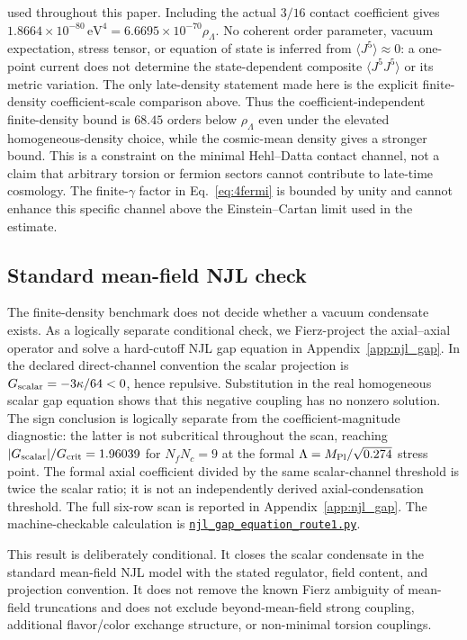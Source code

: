 \documentclass[aps,prd,twocolumn,superscriptaddress,showpacs,preprintnumbers,nofootinbib,longbibliography,floatfix]{revtex4-2}
\newcommand{\artifactnamed}[2]{\href{https://github.com/Hubify-Projects/bigbounce/blob/main/#1}{\nolinkurl{#2}}}
\begin{document}
used throughout this paper.  Including the actual $3/16$ contact coefficient
gives $1.8664\times10^{-80}\,\text{eV}^4=6.6695\times10^{-70}\rho_\Lambda$.
No coherent order parameter, vacuum expectation, stress tensor, or equation of
state is inferred from $\langle J^5\rangle\approx0$: a one-point current does
not determine the state-dependent composite $\langle J^5J^5\rangle$ or its
metric variation.  The only late-density statement made here is the explicit
finite-density coefficient-scale comparison above.
Thus the coefficient-independent finite-density bound is $68.45$ orders below
$\rho_\Lambda$ even under the elevated homogeneous-density choice, while the
cosmic-mean density gives a stronger bound.  This is a constraint on the
minimal Hehl--Datta contact channel, not a claim that arbitrary torsion or
fermion sectors cannot contribute to late-time cosmology.  The finite-$\gamma$
factor in Eq.~\eqref{eq:4fermi} is bounded by unity and cannot enhance this
specific channel above the Einstein--Cartan limit used in the estimate.

\subsection{Standard mean-field NJL check}

The finite-density benchmark does not decide whether a vacuum condensate
exists.  As a logically separate conditional check, we Fierz-project the
axial--axial operator and solve a
hard-cutoff NJL gap equation in Appendix~\ref{app:njl_gap}.  In the declared
direct-channel convention the scalar projection is
$G_{\rm scalar}=-3\kappa/64<0$, hence repulsive.  Substitution in the real
homogeneous scalar gap equation shows that this negative coupling has no
nonzero solution.  The sign conclusion is logically separate from the
coefficient-magnitude diagnostic: the latter is not subcritical throughout
the scan, reaching $|G_{\rm scalar}|/G_{\rm crit}=1.96039$ for
$N_fN_c=9$ at the formal $\Lambda=M_{\rm Pl}/\sqrt{0.274}$ stress point.
The formal axial coefficient divided by the same scalar-channel threshold is
twice the scalar ratio; it is not an independently derived axial-condensation
threshold.  The full six-row scan is reported in Appendix~\ref{app:njl_gap}.
The machine-checkable calculation is
\artifactnamed{arxiv/scripts/njl_gap_equation_route1.py}{njl_gap_equation_route1.py}.

This result is deliberately conditional.  It closes the scalar condensate in
the standard mean-field NJL model with the stated regulator, field content,
and projection convention.  It does not remove the known Fierz ambiguity of
mean-field truncations and does not exclude beyond-mean-field strong coupling,
additional flavor/color exchange structure, or non-minimal torsion couplings.
\end{document}
